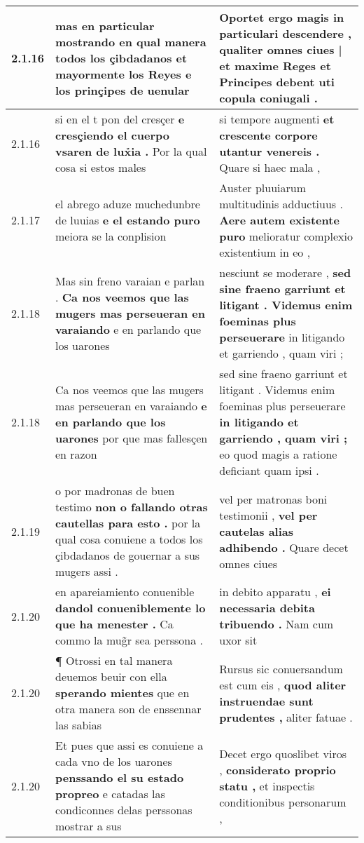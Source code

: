 \begin{tabular}{|p{1cm}|p{6.5cm}|p{6.5cm}|}
2.1.16 & mas en particular \textbf{ mostrando en qual manera todos los çibdadanos et mayormente los Reyes } e los prinçipes de uenular & Oportet ergo magis in particulari descendere , \textbf{ qualiter omnes ciues | et maxime Reges et Principes debent } uti copula coniugali . \\\hline
2.1.16 & si en el t pon del cresçer \textbf{ e cresçiendo el cuerpo vsaren de lux̉ia . } Por la qual cosa si estos males & si tempore augmenti \textbf{ et crescente corpore utantur venereis . } Quare si haec mala , \\\hline
2.1.17 & el abrego aduze muchedunbre de luuias \textbf{ e el estando puro } meiora se la conplision & Auster pluuiarum multitudinis adductiuus . \textbf{ Aere autem existente puro } melioratur complexio existentium in eo , \\\hline
2.1.18 & Mas sin freno varaian e parlan . \textbf{ Ca nos veemos que las mugers mas perseueran en varaiando } e en parlando que los uarones & nesciunt se moderare , \textbf{ sed sine fraeno garriunt et litigant . Videmus enim foeminas plus perseuerare } in litigando et garriendo , quam viri ; \\\hline
2.1.18 & Ca nos veemos que las mugers mas perseueran en varaiando \textbf{ e en parlando que los uarones } por que mas fallesçen en razon & sed sine fraeno garriunt et litigant . Videmus enim foeminas plus perseuerare \textbf{ in litigando et garriendo , quam viri ; } eo quod magis a ratione deficiant quam ipsi . \\\hline
2.1.19 & o por madronas de buen testimo \textbf{ non o fallando otras cautellas para esto . } por la qual cosa conuiene a todos los çibdadanos de gouernar a sus mugers assi . & vel per matronas boni testimonii , \textbf{ vel per cautelas alias adhibendo . } Quare decet omnes ciues \\\hline
2.1.20 & en apareiamiento conuenible \textbf{ dandol conueniblemente lo que ha menester . } Ca commo la mug̃r sea perssona . & in debito apparatu , \textbf{ ei necessaria debita tribuendo . } Nam cum uxor sit \\\hline
2.1.20 & ¶ Otrossi en tal manera deuemos beuir con ella \textbf{ sperando mientes } que en otra manera son de enssennar las sabias & Rursus sic conuersandum est cum eis , \textbf{ quod aliter instruendae sunt prudentes , } aliter fatuae . \\\hline
2.1.20 & Et pues que assi es conuiene a cada vno de los uarones \textbf{ penssando el su estado propreo } e catadas las condiconnes delas perssonas mostrar a sus & Decet ergo quoslibet viros , \textbf{ considerato proprio statu , } et inspectis conditionibus personarum , \\\hline

\end{tabular}
